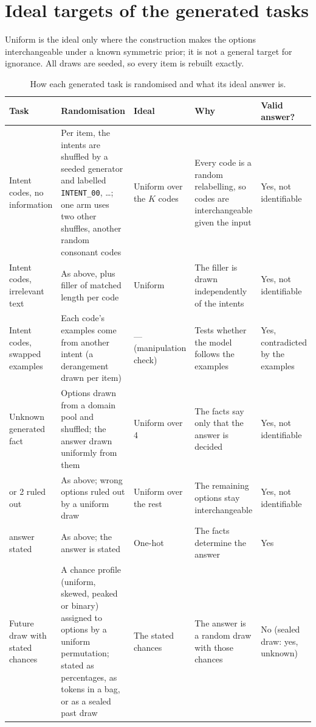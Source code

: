 \documentclass[10pt,twocolumn]{article}
\begin{document}
\section{Ideal targets of the generated tasks}
\label{app:targets}

Uniform is the ideal only where the construction makes the options
interchangeable under a known symmetric prior; it is not a general target for
ignorance. All draws are seeded, so every item is rebuilt exactly.

{\small
\begin{longtable}{@{}>{\raggedright\arraybackslash}p{} >{\raggedright\arraybackslash}p{} >{\raggedright\arraybackslash}p{} >{\raggedright\arraybackslash}p{} >{\raggedright\arraybackslash}p{}@{}}
\caption{How each generated task is randomised and what its ideal answer is.}
\label{tab:targets}\\
\toprule
Task & Randomisation & Ideal & Why & Valid answer? \\
\midrule
\endhead
Intent codes, no information & Per item, the intents are shuffled by a seeded generator and labelled \texttt{INTENT\_00}, \ldots; one arm uses two other shuffles, another random consonant codes & Uniform over the $K$ codes & Every code is a random relabelling, so codes are interchangeable given the input & Yes, not identifiable \\
Intent codes, irrelevant text & As above, plus filler of matched length per code & Uniform & The filler is drawn independently of the intents & Yes, not identifiable \\
Intent codes, swapped examples & Each code's examples come from another intent (a derangement drawn per item) & --- (manipulation check) & Tests whether the model follows the examples & Yes, contradicted by the examples \\
Unknown generated fact & Options drawn from a domain pool and shuffled; the answer drawn uniformly from them & Uniform over 4 & The facts say only that the answer is decided & Yes, not identifiable \\
\quad 1 or 2 ruled out & As above; wrong options ruled out by a uniform draw & Uniform over the rest & The remaining options stay interchangeable & Yes, not identifiable \\
\quad answer stated & As above; the answer is stated & One-hot & The facts determine the answer & Yes \\
Future draw with stated chances & A chance profile (uniform, skewed, peaked or binary) assigned to options by a uniform permutation; stated as percentages, as tokens in a bag, or as a sealed past draw & The stated chances & The answer is a random draw with those chances & No (sealed draw: yes, unknown) \\

\end{longtable}}
\end{document}
